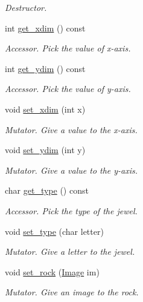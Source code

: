 \begin{DoxyCompactItemize}
\begin{DoxyCompactList}\small\item\em Destructor. \end{DoxyCompactList}\item 
int \hyperlink{classJewel_a023f697e2e4d4f04ddfe36dabdb44ced}{get\+\_\+xdim} () const 
\begin{DoxyCompactList}\small\item\em Accessor. Pick the value of x-\/axis. \end{DoxyCompactList}\item 
int \hyperlink{classJewel_a48167d37f4af709167007e7987b7f889}{get\+\_\+ydim} () const 
\begin{DoxyCompactList}\small\item\em Accessor. Pick the value of y-\/axis. \end{DoxyCompactList}\item 
void \hyperlink{classJewel_a2910a83ae628913f5138945a7ebff333}{set\+\_\+xdim} (int x)
\begin{DoxyCompactList}\small\item\em Mutator. Give a value to the x-\/axis. \end{DoxyCompactList}\item 
void \hyperlink{classJewel_a64b57d2cb0fcb99fa1e1a6aec0f7047c}{set\+\_\+ydim} (int y)
\begin{DoxyCompactList}\small\item\em Mutator. Give a value to the y-\/axis. \end{DoxyCompactList}\item 
char \hyperlink{classJewel_a3d1b09f84ad4c7ceff37d80ed169661a}{get\+\_\+type} () const 
\begin{DoxyCompactList}\small\item\em Accessor. Pick the type of the jewel. \end{DoxyCompactList}\item 
void \hyperlink{classJewel_a295f109ccd6da0a2f2a0ce9a7ebda3c4}{set\+\_\+type} (char letter)
\begin{DoxyCompactList}\small\item\em Mutator. Give a letter to the jewel. \end{DoxyCompactList}\item 
void \hyperlink{classJewel_ab6bc34934b2df83414bd8313c0bdc7b9}{set\+\_\+rock} (\hyperlink{classImage}{Image} im)
\begin{DoxyCompactList}\small\item\em Mutator. Give an image to the rock. \end{DoxyCompactList}\item 

\end{DoxyCompactItemize}
